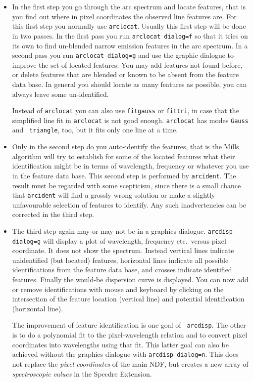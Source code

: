\documentclass[11pt,twoside]{article}
\newcommand{\htmlref}[2]{#1}
\begin{document}
\begin{itemize}
\item In the first step you go through the arc spectrum and locate
   features, that is you find out where in pixel coordinates the
   observed line features are.  For this first step you normally use
{\tt\htmlref{arclocat}{ARCLOCAT}}.
   Usually this first step will be done in two passes. In the first pass
   you run {\tt arclocat dialog=f} so that it tries on its own to find
   un-blended narrow emission features in the arc spectrum.  In a second
   pass you run {\tt arclocat dialog=g} and use the graphic dialogue to
   improve the set of located features.  You may add features not found
   before, or delete features that are blended or known to be absent
   from the feature data base.  In general you should locate as many
   features as possible, you can always leave some un-identified.

   Instead of {\tt arclocat} you can also use
{\tt\htmlref{fitgauss}{FITGAUSS}}
   or
{\tt\htmlref{fittri}{FITTRI}},
   in case that the simplified line fit in {\tt arclocat} is
   not good enough.  {\tt arclocat} has modes {\tt Gauss} and {\tt
   triangle}, too, but it fits only one line at a time.

\item Only in the second step do you auto-identify the features, that is
   the Mills algorithm will try to establish for some of the located
   features what their identification might be in terms of wavelength,
   frequency or whatever you use in the feature data base.  This second
   step is performed by
{\tt\htmlref{arcident}{ARCIDENT}}.
   The result must be regarded with some scepticism, since there is a
   small chance that {\tt arcident} will find a grossly wrong solution or
   make a slightly unfavourable selection of features to identify.  Any
   such inadvertencies can be corrected in the third step.

\item The third step again may or may not be in a graphics dialogue.
{\tt\htmlref{arcdisp}{ARCDISP} dialog=g} will display a plot of
   wavelength, frequency etc.\ versus pixel coordinate.  It does not
   show the spectrum. Instead vertical lines indicate unidentified (but
   located) features, horizontal lines indicate all possible
   identifications from the feature data base, and crosses indicate
   identified features. Finally the would-be dispersion curve is
   displayed.  You can now add or remove identifications with mouse and
   keyboard by clicking on the intersection of the feature location
   (vertical line) and potential identification (horizontal line).

   The improvement of feature identification is one goal of {\tt
   arcdisp}.  The other is to do a polynomial fit to the
   pixel-wavelength relation and to convert pixel coordinates into
   wavelengths using that fit.  This latter goal can also be achieved
   without the graphics dialogue with {\tt arcdisp dialog=n}.  This does
   not replace the {\it pixel coordinates} of the main NDF, but creates
   a new array of {\it spectroscopic values} in the Specdre Extension.
\end{itemize}
\end{document}
